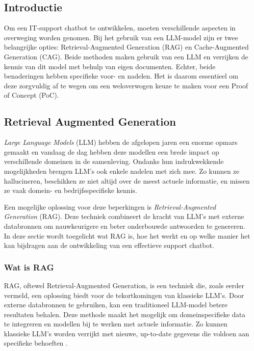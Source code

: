     \subsection{Introductie}
    
    Om een IT-support chatbot te ontwikkelen, moeten verschillende aspecten in overweging worden genomen. Bij het gebruik van een LLM-model zijn er twee belangrijke opties: Retrieval-Augmented Generation (RAG) en Cache-Augmented Generation (CAG). Beide methoden maken gebruik van een LLM en verrijken de kennis van dit model met behulp van eigen documenten. Echter, beide benaderingen hebben specifieke voor- en nadelen. Het is daarom essentieel om deze zorgvuldig af te wegen om een weloverwogen keuze te maken voor een Proof of Concept (PoC).
    
    \subsection{Retrieval Augmented Generation}
    
    \textit{Large Language Models} (LLM) hebben de afgelopen jaren een enorme opmars gemaakt en vandaag de dag hebben deze modellen een brede impact op verschillende domeinen in de samenleving. Ondanks hun indrukwekkende mogelijkheden brengen LLM’s ook enkele nadelen met zich mee. Zo kunnen ze hallucineren, beschikken ze niet altijd over de meest actuele informatie, en missen ze vaak domein- en bedrijfsspecifieke kennis.  
    
    Een mogelijke oplossing voor deze beperkingen is \textit{Retrieval-Augmented Generation} (RAG). Deze techniek combineert de kracht van LLM’s met externe databronnen om nauwkeurigere en beter onderbouwde antwoorden te genereren. In deze sectie wordt toegelicht wat RAG is, hoe het werkt en op welke manier het kan bijdragen aan de ontwikkeling van een effectieve support chatbot.
    
    \subsubsection{Wat is RAG}
    RAG, oftewel Retrieval-Augmented Generation, is een techniek die, zoals eerder vermeld, een oplossing biedt voor de tekortkomingen van klassieke LLM’s. Door externe databronnen te gebruiken, kan een traditioneel LLM-model betere resultaten behalen. Deze methode maakt het mogelijk om domeinspecifieke data te integreren en modellen bij te werken met actuele informatie. Zo kunnen klassieke LLM’s worden verrijkt met nieuwe, up-to-date gegevens die voldoen aan specifieke behoeften \autocite{Wu2024}.
    
